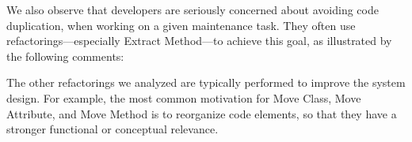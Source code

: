 We also observe that developers are seriously concerned about avoiding code duplication, when working on a given maintenance task. They often use refactorings---especially {\textsc Extract Method}---to
achieve this goal, as illustrated by the following comments:\margin

\margin

\margin

The other refactorings we analyzed are typically performed to improve the system design. For example,
the most common motivation for {\textsc Move Class}, {\textsc Move Attribute}, and {\textsc Move Method} is to reorganize
code elements, so that they have a stronger functional or conceptual relevance.\margin


